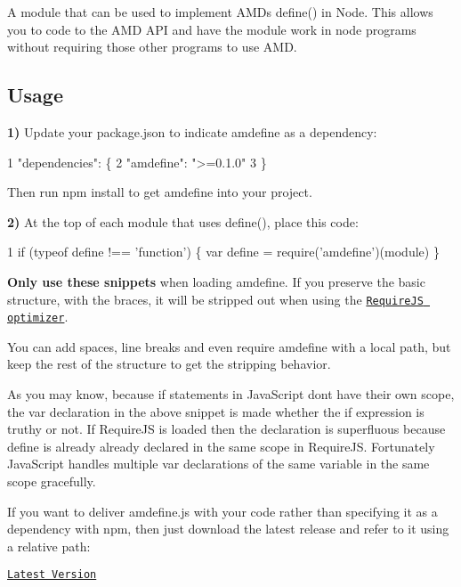 A module that can be used to implement A\+M\+D\textquotesingle{}s define() in Node. This allows you to code to the A\+M\+D A\+P\+I and have the module work in node programs without requiring those other programs to use A\+M\+D.

\subsection*{Usage}

{\bfseries 1)} Update your package.\+json to indicate amdefine as a dependency\+:


\begin{DoxyCode}
1 "dependencies": \{
2     "amdefine": ">=0.1.0"
3 \}
\end{DoxyCode}


Then run {\ttfamily npm install} to get amdefine into your project.

{\bfseries 2)} At the top of each module that uses define(), place this code\+:


\begin{DoxyCode}
1 if (typeof define !== 'function') \{ var define = require('amdefine')(module) \}
\end{DoxyCode}


{\bfseries Only use these snippets} when loading amdefine. If you preserve the basic structure, with the braces, it will be stripped out when using the \href{#optimizer}{\tt Require\+J\+S optimizer}.

You can add spaces, line breaks and even require amdefine with a local path, but keep the rest of the structure to get the stripping behavior.

As you may know, because {\ttfamily if} statements in Java\+Script don\textquotesingle{}t have their own scope, the var declaration in the above snippet is made whether the {\ttfamily if} expression is truthy or not. If Require\+J\+S is loaded then the declaration is superfluous because {\ttfamily define} is already already declared in the same scope in Require\+J\+S. Fortunately Java\+Script handles multiple {\ttfamily var} declarations of the same variable in the same scope gracefully.

If you want to deliver amdefine.\+js with your code rather than specifying it as a dependency with npm, then just download the latest release and refer to it using a relative path\+:

\href{https://github.com/jrburke/amdefine/raw/latest/amdefine.js}{\tt Latest Version}

